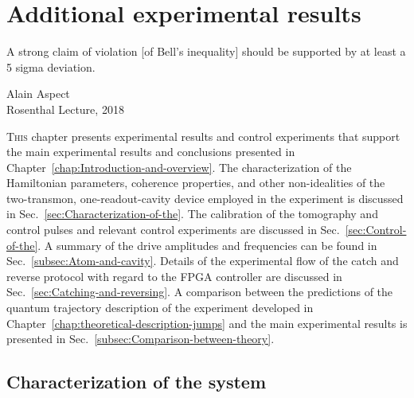 
\chapter{Additional experimental results\label{chap:Experimental-results} }


\singlespacing 
\epigraph{
A strong claim of violation [of Bell's inequality] should be supported by at least a 5 sigma deviation.}
{Alain Aspect\\Rosenthal Lecture, 2018} 
\doublespacing\noindent \noindent\lettrine{T}{his} chapter presents experimental results
and control experiments that support the main experimental results
and conclusions presented in Chapter~\ref{chap:Introduction-and-overview}.
The characterization of the Hamiltonian parameters, coherence properties,
and other non-idealities of the two-transmon, one-readout-cavity device
employed in the experiment is discussed in Sec.~\ref{sec:Characterization-of-the}.
The calibration  of the tomography and control pulses and relevant
control experiments are discussed in Sec.~\ref{sec:Control-of-the}.
A summary of the  drive amplitudes and frequencies can be found in
Sec.~\ref{subsec:Atom-and-cavity}. Details of the experimental flow
of the catch and reverse protocol with regard to the FPGA controller
are discussed in Sec.~\ref{sec:Catching-and-reversing}. A comparison
between the predictions of the quantum trajectory description of the
experiment developed in Chapter~\ref{chap:theoretical-description-jumps}
and the main experimental results is presented in Sec.~\ref{subsec:Comparison-between-theory}.

\section{Characterization of the system\label{sec:Characterization-of-the}}

